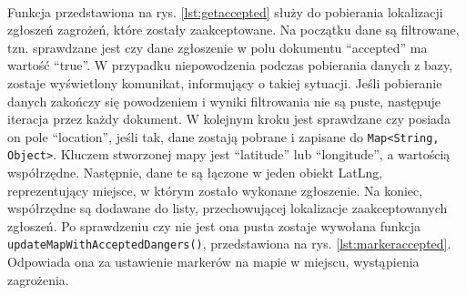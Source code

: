 \noindent
\setlength{\fboxrule}{0.5pt}
\begin{minipage}{\linewidth}
    \label{lst:accepted}
    \centering
\end{minipage}
\\

Funkcja przedstawiona na rys. \ref{lst:getaccepted} służy do pobierania lokalizacji zgłoszeń zagrożeń, które zostały zaakceptowane. Na początku dane są filtrowane, tzn. sprawdzane jest czy dane zgłoszenie w polu dokumentu “accepted” ma wartość “true”. W przypadku niepowodzenia podczas pobierania danych z bazy, zostaje wyświetlony komunikat, informujący o takiej sytuacji. Jeśli pobieranie danych zakończy się powodzeniem i wyniki filtrowania nie są puste, następuje iteracja przez każdy dokument. W kolejnym kroku jest sprawdzane czy posiada on pole “location”, jeśli tak, dane zostają pobrane i zapisane do \verb|Map<String, Object>|. Kluczem stworzonej mapy jest “latitude” lub “longitude”, a wartością współrzędne. Następnie, dane te są łączone w jeden obiekt LatLng, reprezentujący miejsce, w którym zostało wykonane zgłoszenie. Na koniec, współrzędne są dodawane do listy, przechowującej lokalizacje zaakceptowanych zgłoszeń. Po sprawdzeniu czy nie jest ona pusta zostaje wywołana funkcja \verb|updateMapWithAcceptedDangers()|, przedstawiona na rys. \ref{lst:markeraccepted}. Odpowiada ona za ustawienie markerów na mapie w miejscu, wystąpienia zagrożenia. \\

\noindent
\setlength{\fboxrule}{0.5pt}
\begin{minipage}{\linewidth}
    \label{lst:getaccepted}
    \centering
\end{minipage}
\\

